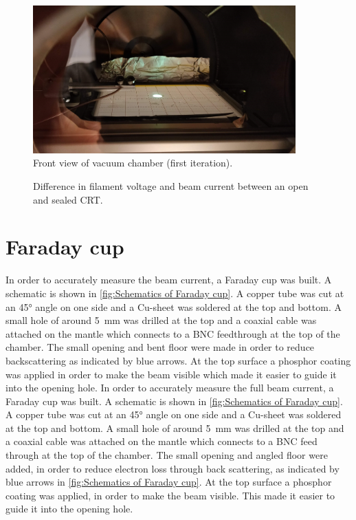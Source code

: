 \begin{figure}[h]
	\centering
	\includegraphics[width=0.9\textwidth]{./Chapters/beam-characterization/center_image}
	\caption{Front view of vacuum chamber (first iteration).}
	\label{fig:Front view of vacuum chamber (first iteration)}
\end{figure}


\begin{figure}[ht]
	\centering
	
	\begin{tikzpicture}
		
	\end{tikzpicture}
	
	\caption{Difference in filament voltage and beam current between an open and sealed CRT.}
	\label{fig:Difference in filament voltage and beam current between an open and sealed CRT}
\end{figure}

\section{Faraday cup}
\label{sec:Faraday cup}


In order to accurately measure the beam current, a Faraday cup was built. A schematic is shown in \cref{fig:Schematics of Faraday cup}. A copper tube was cut at an \ang{45} angle on one side and a Cu-sheet was soldered at the top and bottom. A small hole of around \SI{5}{\milli\meter} was drilled at the top and a coaxial cable was attached on the mantle which connects to a BNC feedthrough at the top of the chamber. The small opening and bent floor were made in order to reduce backscattering as indicated by blue arrows. At the top surface a phosphor coating was applied in order to make the beam visible which made it easier to guide it into the opening hole.
In order to accurately measure the full beam current, a Faraday cup was built. A schematic is shown in \cref{fig:Schematics of Faraday cup}. A copper tube was cut at an \ang{45} angle on one side and a Cu-sheet was soldered at the top and bottom. A small hole of around \SI{5}{\milli\meter} was drilled at the top and a coaxial cable was attached on the mantle which connects to a BNC feed through at the top of the chamber. The small opening and angled floor were added, in order to reduce electron loss through back scattering, as indicated by blue arrows in \cref{fig:Schematics of Faraday cup}. At the top surface a phosphor coating was applied, in order to make the beam visible. This made it easier to guide it into the opening hole.


